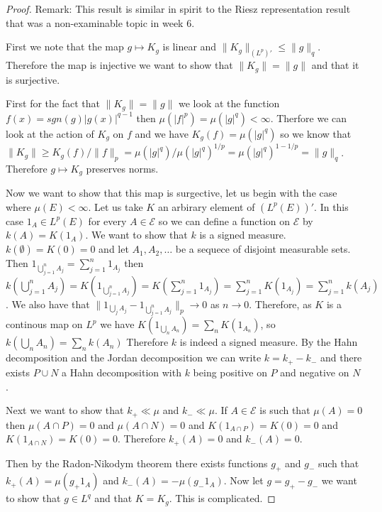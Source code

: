 \documentclass[
]{book}
\theoremstyle{definition}
\theoremstyle{definition}
\theoremstyle{definition}
\theoremstyle{definition}
\theoremstyle{remark}
\begin{document}
\begin{proof}
Remark: This result is similar in spirit to the Riesz representation result that was a non-examinable topic in week 6.

First we note that the map \(g \mapsto K_g\) is linear and \(\|K_g\|_{(L^p)'} \leq \|g\|_q\). Therefore the map is injective we want to show that \(\|K_g\| = \|g\|\) and that it is surjective.

First for the fact that \(\|K_g\| = \|g\|\) we look at the function \(f(x) = sgn(g)|g(x)|^{q-1}\) then \(\mu(|f|^p) = \mu(|g|^q) < \infty\). Therfore we can look at the action of \(K_g\) on \(f\) and we have \(K_g(f) = \mu(|g|^q)\) so we know that \(\|K_g\| \geq K_g(f)/\|f\|_p = \mu(|g|^q)/\mu(|g|^q)^{1/p} = \mu(|g|^q)^{1-1/p} = \|g\|_q\). Therefore \(g \mapsto K_g\) preserves norms.

Now we want to show that this map is surgective, let us begin with the case where \(\mu(E)<\infty\). Let us take \(K\) an arbirary element of \((L^p(E))'\). In this case \(1_A \in L^p(E)\) for every \(A \in \mathcal{E}\) so we can define a function on \(\mathcal{E}\) by \(k(A)=K(1_A)\). We want to show that \(k\) is a signed measure. \(k(\emptyset)=K(0)=0\) and let \(A_1,A_2,\dots\) be a sequece of disjoint measurable sets. Then \(1_{\bigcup_{j=1}^n A_j} = \sum_{j=1}^n 1_{A_j}\) then \(k(\bigcup_{j=1}^n A_j) = K(1_{\bigcup_{j=1}^n A_j}) = K( \sum_{j=1}^n 1_{A_j}) = \sum_{j=1}^n K(1_{A_j}) = \sum_{j=1}^n k(A_j)\). We also have that \(\| 1_{\bigcup_j A_j} - 1_{\bigcup_{j=1}^n A_j} \|_p \rightarrow 0\) as \(n \rightarrow 0\). Therefore, as \(K\) is a continous map on \(L^p\) we have \(K(1_{\bigcup_n A_n}) = \sum_n K(1_{A_n})\), so \(k(\bigcup_n A_n) = \sum_n k(A_n)\) Therefore \(k\) is indeed a signed measure. By the Hahn decomposition and the Jordan decomposition we can write \(k = k_+ - k_-\) and there exists \(P \cup N\) a Hahn decomposition with \(k\) being positive on \(P\) and negative on \(N\).

Next we want to show that \(k_+ \ll \mu\) and \(k_- \ll \mu\). If \(A \in \mathcal{E}\) is such that \(\mu(A) = 0\) then \(\mu(A \cap P)=0\) and \(\mu(A \cap N) = 0\) and \(K(1_{A \cap P}) = K(0) = 0\) and \(K(1_{A \cap N}) = K(0) = 0\). Therefore \(k_+(A) = 0\) and \(k_-(A) = 0\).

Then by the Radon-Nikodym theorem there exists functions \(g_+\) and \(g_-\) such that \(k_+(A) = \mu(g_+1_A)\) and \(k_-(A) = - \mu(g_- 1_A)\). Now let \(g = g_+ - g_-\) we want to show that \(g \in L^q\) and that \(K = K_g\). This is complicated.


\end{proof}
\end{document}
